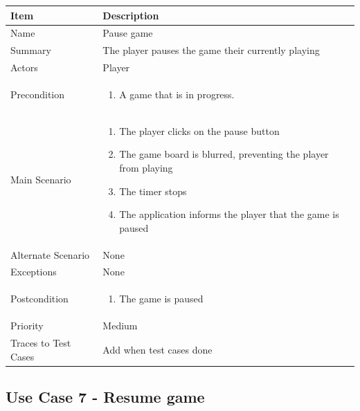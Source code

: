 \documentclass[12pt]{article}
\begin{document}
\begin{center}
\setlength{\tabcolsep}{18pt}
\renewcommand{\arraystretch}{1.3}
\begin{tabular}{ |p{3.4cm}|p{10cm}| }
    \hline
    \textbf{Item} & \textbf{Description} \\
    \hline
    Name & Pause game \\
    \hline
    Summary & The player pauses the game their currently playing \\
    \hline
    Actors & Player \\
    \hline
    Precondition & 
    \vspace*{-0.1in}
    \begin{enumerate}[leftmargin=0.2in]
        \item A game that is in progress.
    \end{enumerate}  \\
    \hline
    Main Scenario &     
    \vspace*{-0.1in}
    \begin{enumerate}[leftmargin=0.2in]
        \item The player clicks on the pause button
        \item The game board is blurred, preventing the player from playing
        \item The timer stops  
        \item The application informs the player that the game is paused
    \end{enumerate}  \\
    \hline
    Alternate Scenario & None \\
    \hline
    Exceptions & None \\
    \hline
    Postcondition & \vspace*{-0.1in}
    \begin{enumerate}[leftmargin=0.2in]
        \item The game is paused
    \end{enumerate}  \\
    \hline
    Priority & Medium  \\
    \hline
    Traces to Test Cases & Add when test cases done  \\
    \hline
\end{tabular}
\end{center}

\newpage


\subsection{Use Case 7 - Resume game}
\end{document}
